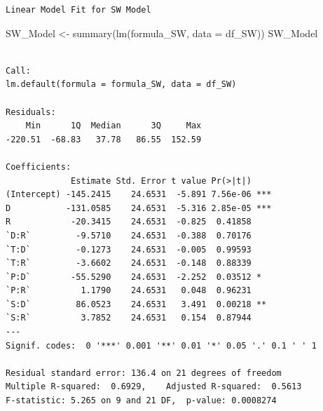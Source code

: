 \documentclass[
  letterpaper,
  DIV=11,
  numbers=noendperiod]{scrartcl}
\newenvironment{Shaded}{\begin{snugshade}}{\end{snugshade}}
\newcommand{\AttributeTok}[1]{\textcolor[rgb]{0.40,0.45,0.13}{#1}}
\newcommand{\FunctionTok}[1]{\textcolor[rgb]{0.28,0.35,0.67}{#1}}
\newcommand{\NormalTok}[1]{\textcolor[rgb]{0.00,0.23,0.31}{#1}}
\newcommand{\OtherTok}[1]{\textcolor[rgb]{0.00,0.23,0.31}{#1}}
\begin{document}
\begin{verbatim}
Linear Model Fit for SW Model 
\end{verbatim}

\begin{Shaded}
\begin{Highlighting}[]
\NormalTok{SW\_Model }\OtherTok{\textless{}{-}} \FunctionTok{summary}\NormalTok{(}\FunctionTok{lm}\NormalTok{(formula\_SW, }\AttributeTok{data =}\NormalTok{ df\_SW))}
\NormalTok{SW\_Model}
\end{Highlighting}
\end{Shaded}

\begin{verbatim}

Call:
lm.default(formula = formula_SW, data = df_SW)

Residuals:
    Min      1Q  Median      3Q     Max 
-220.51  -68.83   37.78   86.55  152.59 

Coefficients:
             Estimate Std. Error t value Pr(>|t|)    
(Intercept) -145.2415    24.6531  -5.891 7.56e-06 ***
D           -131.0585    24.6531  -5.316 2.85e-05 ***
R            -20.3415    24.6531  -0.825  0.41858    
`D:R`         -9.5710    24.6531  -0.388  0.70176    
`T:D`         -0.1273    24.6531  -0.005  0.99593    
`T:R`         -3.6602    24.6531  -0.148  0.88339    
`P:D`        -55.5290    24.6531  -2.252  0.03512 *  
`P:R`          1.1790    24.6531   0.048  0.96231    
`S:D`         86.0523    24.6531   3.491  0.00218 ** 
`S:R`          3.7852    24.6531   0.154  0.87944    
---
Signif. codes:  0 '***' 0.001 '**' 0.01 '*' 0.05 '.' 0.1 ' ' 1

Residual standard error: 136.4 on 21 degrees of freedom
Multiple R-squared:  0.6929,    Adjusted R-squared:  0.5613 
F-statistic: 5.265 on 9 and 21 DF,  p-value: 0.0008274
\end{verbatim}
\end{document}
